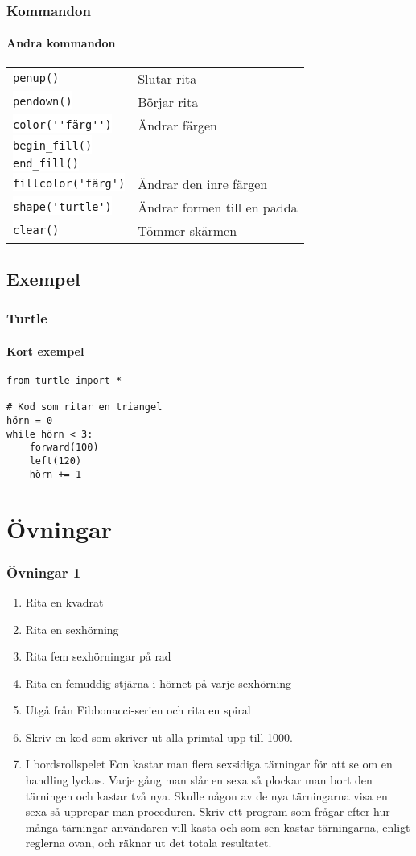 \documentclass[aspectratio=169]{beamer}
\newcommand{\code}[1]{\colorbox{white}{\lstinline{#1}}}
\begin{document}
\begin{frame}
	\frametitle{Kommandon}
	\framesubtitle{Andra kommandon}
	
	\begin{tabular}{ll}
		\code{penup()} & Slutar rita\\
		\code{pendown()} & Börjar rita\\
		\code{color(''färg'')} & Ändrar färgen\\
		\code{begin_fill()} & \\
		\code{end_fill()} & \\
		\code{fillcolor('färg')} & Ändrar den inre färgen\\
		\code{shape('turtle')} & Ändrar formen till en padda\\
		\code{clear()} & Tömmer skärmen
	\end{tabular}
	
\end{frame}

\subsection{Exempel}

\begin{frame}[fragile]
	\frametitle{Turtle}
	\framesubtitle{Kort exempel}
	
	\begin{lstlisting}
from turtle import *

# Kod som ritar en triangel
hörn = 0
while hörn < 3: 
    forward(100)
    left(120)
    hörn += 1
	\end{lstlisting}
	
\end{frame}

\section{Övningar}

\begin{frame}
\frametitle{Övningar 1}

	\begin{enumerate}
		\item Rita en kvadrat
		\item Rita en sexhörning
		\item Rita fem sexhörningar på rad
		\item Rita en femuddig stjärna i hörnet på varje sexhörning
		\item Utgå från Fibbonacci-serien och rita en spiral
		\item Skriv en kod som skriver ut alla primtal upp till 1000.
		\item I bordsrollspelet Eon kastar man flera sexsidiga tärningar för att se om en handling lyckas. Varje gång man slår en sexa så plockar man bort den tärningen och kastar två nya. Skulle någon av de nya tärningarna visa en sexa så upprepar man proceduren. Skriv ett program som frågar efter hur många tärningar användaren vill kasta och som sen kastar tärningarna, enligt reglerna ovan, och räknar ut det totala resultatet.
	\end{enumerate}

\end{frame}
\end{document}
